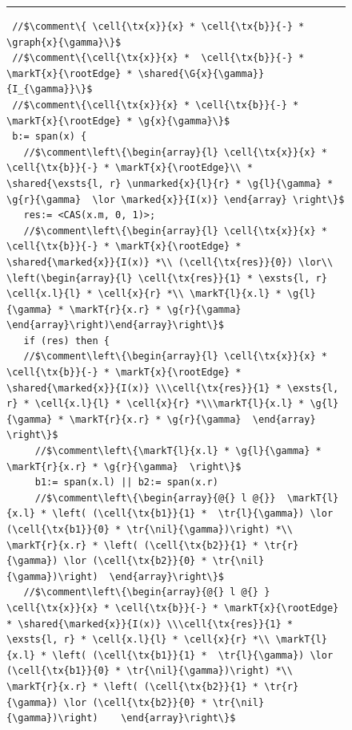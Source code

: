 \begin{figure}
\hrule
\begin{lstlisting}
 //$\comment\{ \cell{\tx{x}}{x} * \cell{\tx{b}}{-} * \graph{x}{\gamma}\}$
 //$\comment\{\cell{\tx{x}}{x} *  \cell{\tx{b}}{-} * \markT{x}{\rootEdge} * \shared{\G{x}{\gamma}}{I_{\gamma}}\}$
 //$\comment\{\cell{\tx{x}}{x} * \cell{\tx{b}}{-} * \markT{x}{\rootEdge} * \g{x}{\gamma}\}$
 b:= span(x) {
   //$\comment\left\{\begin{array}{l} \cell{\tx{x}}{x} * \cell{\tx{b}}{-} * \markT{x}{\rootEdge}\\ * \shared{\exsts{l, r} \unmarked{x}{l}{r} * \g{l}{\gamma} * \g{r}{\gamma}  \lor \marked{x}}{I(x)} \end{array} \right\}$
   res:= <CAS(x.m, 0, 1)>;
   //$\comment\left\{\begin{array}{l} \cell{\tx{x}}{x} * \cell{\tx{b}}{-} * \markT{x}{\rootEdge} * \shared{\marked{x}}{I(x)} *\\ (\cell{\tx{res}}{0}) \lor\\  \left(\begin{array}{l} \cell{\tx{res}}{1} * \exsts{l, r} \cell{x.l}{l} * \cell{x}{r} *\\ \markT{l}{x.l} * \g{l}{\gamma} * \markT{r}{x.r} * \g{r}{\gamma} \end{array}\right)\end{array}\right\}$
   if (res) then { 
   //$\comment\left\{\begin{array}{l} \cell{\tx{x}}{x} * \cell{\tx{b}}{-} * \markT{x}{\rootEdge} * \shared{\marked{x}}{I(x)} \\\cell{\tx{res}}{1} * \exsts{l, r} * \cell{x.l}{l} * \cell{x}{r} *\\\markT{l}{x.l} * \g{l}{\gamma} * \markT{r}{x.r} * \g{r}{\gamma}  \end{array} \right\}$
     //$\comment\left\{\markT{l}{x.l} * \g{l}{\gamma} * \markT{r}{x.r} * \g{r}{\gamma}  \right\}$   
     b1:= span(x.l) || b2:= span(x.r)
     //$\comment\left\{\begin{array}{@{} l @{}}  \markT{l}{x.l} * \left( (\cell{\tx{b1}}{1} *  \tr{l}{\gamma}) \lor (\cell{\tx{b1}}{0} * \tr{\nil}{\gamma})\right) *\\ \markT{r}{x.r} * \left( (\cell{\tx{b2}}{1} * \tr{r}{\gamma}) \lor (\cell{\tx{b2}}{0} * \tr{\nil}{\gamma})\right)  \end{array}\right\}$   
   //$\comment\left\{\begin{array}{@{} l @{} }  \cell{\tx{x}}{x} * \cell{\tx{b}}{-} * \markT{x}{\rootEdge} * \shared{\marked{x}}{I(x)} \\\cell{\tx{res}}{1} * \exsts{l, r} * \cell{x.l}{l} * \cell{x}{r} *\\ \markT{l}{x.l} * \left( (\cell{\tx{b1}}{1} *  \tr{l}{\gamma}) \lor (\cell{\tx{b1}}{0} * \tr{\nil}{\gamma})\right) *\\ \markT{r}{x.r} * \left( (\cell{\tx{b2}}{1} * \tr{r}{\gamma}) \lor (\cell{\tx{b2}}{0} * \tr{\nil}{\gamma})\right)    \end{array}\right\}$  

\end{lstlisting}
\end{figure}
